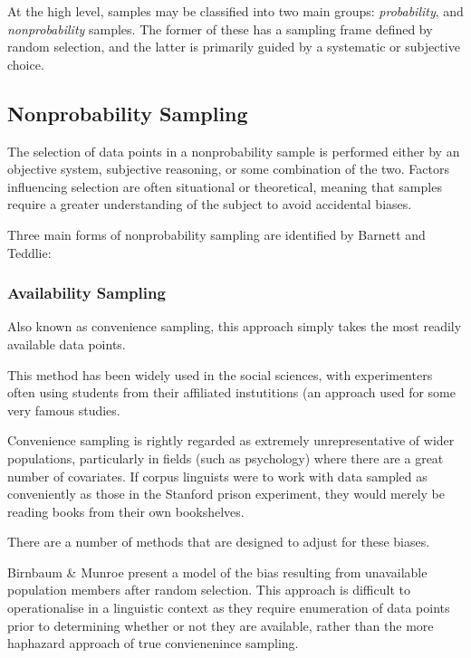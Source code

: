 At the high level, samples may be classified into two main groups: \textsl{probability}, and \textsl{nonprobability} samples.  The former of these has a sampling frame defined by random selection, and the latter is primarily guided by a systematic or subjective choice.

\subsection{Nonprobability Sampling}
The selection of data points in a nonprobability sample is performed either by an objective system, subjective reasoning, or some combination of the two.  Factors influencing selection are often situational or theoretical, meaning that samples require a greater understanding of the subject to avoid accidental biases.  


Three main forms of nonprobability sampling are identified by Barnett\cite{barnett1991sample} and Teddlie\cite{Teddlie01012007}:

\subsubsection{Availability Sampling}
Also known as convenience sampling, this approach simply takes the most readily available data points.

This method has been widely used in the social sciences, with experimenters often using students from their affiliated instutitions (an approach used for some very famous studies\cite{zimbardo1971stanford}.

Convenience sampling is rightly regarded as extremely unrepresentative of wider populations, particularly in fields (such as psychology) where there are a great number of covariates.  If corpus linguists were to work with data sampled as conveniently as those in the Stanford prison experiment, they would merely be reading books from their own bookshelves.

There are a number of methods that are designed to adjust for these biases.  

Birnbaum \& Munroe\cite{birnbaum1950munroe} present a model of the bias resulting from unavailable population members after random selection.  This approach is difficult to operationalise in a linguistic context as they require enumeration of data points prior to determining whether or not they are available, rather than the more haphazard approach of true convienenince sampling.


